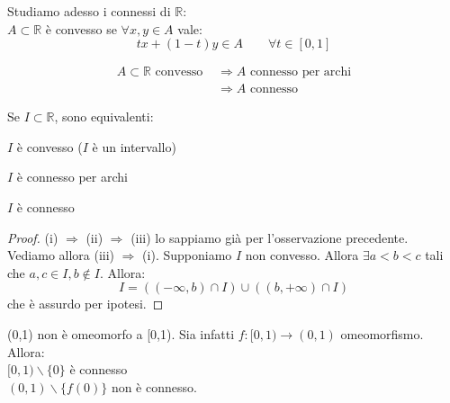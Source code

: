 Studiamo adesso i connessi di $\mathbb{R}$:\\
$A \subset \mathbb{R}$ è convesso se $\forall x,y \in A$ vale:
$$tx+(1-t)y \in A \qquad \forall t \in [0,1]$$

\begin{oss}
\begin{align*}
A \subset \mathbb{R} \text{ convesso } &\Longrightarrow A \text{ connesso per archi}\\
&\Longrightarrow A \text{ connesso}
\end{align*}
\end{oss}

\begin{prop}
Se $I \subset \mathbb{R}$, sono equivalenti:
\begin{nlist}
\item $I$ è convesso ($I$ è un intervallo)
\item $I$ è connesso per archi
\item $I$ è connesso
\end{nlist}
\end{prop}
\begin{proof}
(i) $\Longrightarrow$ (ii) $\Longrightarrow$ (iii) lo sappiamo già per l'osservazione precedente.\\
Vediamo allora (iii) $\Longrightarrow$ (i). Supponiamo $I$ non convesso. Allora $\exists a<b<c$ tali che $a,c \in I, b \notin I$. Allora:
$$I=((-\infty,b) \cap I) \cup ((b,+\infty) \cap I)$$
che è assurdo per ipotesi.
\end{proof}

\begin{ex}
(0,1) non è omeomorfo a [0,1). Sia infatti $f:[0,1) \longrightarrow (0,1)$ omeomorfismo. Allora:\\
$[0,1) \smallsetminus \{0\}$ è connesso\\
$(0,1) \smallsetminus \{f(0)\}$ non è connesso.
\end{ex}

